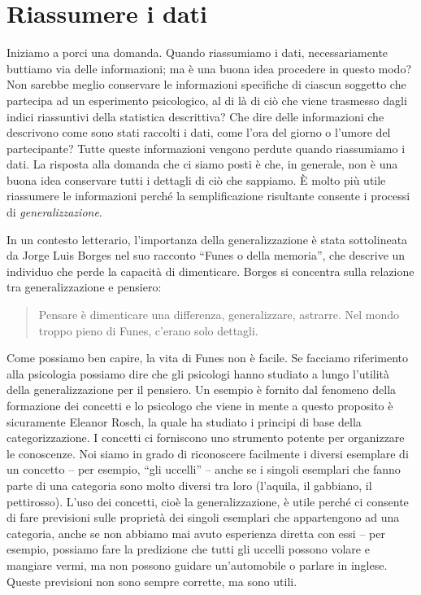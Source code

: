 \documentclass[
  11pt,
  italian,
  a4paper,
  extrafontsizes,onecolumn,openright
  ]{memoir}
\theoremstyle{definition}
\theoremstyle{definition}
\theoremstyle{definition}
\theoremstyle{definition}
\theoremstyle{remark}
\begin{document}
\hypertarget{riassumere-i-dati}{%
\section{Riassumere i dati}\label{riassumere-i-dati}}

Iniziamo a porci una domanda. Quando riassumiamo i dati, necessariamente buttiamo via delle informazioni; ma è una buona idea procedere in questo modo? Non sarebbe meglio conservare le informazioni specifiche di ciascun soggetto che partecipa ad un esperimento psicologico, al di là di ciò che viene trasmesso dagli indici riassuntivi della statistica descrittiva? Che dire delle informazioni che descrivono come sono stati raccolti i dati, come l'ora del giorno o l'umore del partecipante? Tutte queste informazioni vengono perdute quando riassumiamo i dati. La risposta alla domanda che ci siamo posti è che, in generale, non è una buona idea conservare tutti i dettagli di ciò che sappiamo. È molto più utile riassumere le informazioni perché la semplificazione risultante consente i processi di \emph{generalizzazione}.

In un contesto letterario, l'importanza della generalizzazione è stata
sottolineata da Jorge Luis Borges nel suo racconto ``Funes o della
memoria'', che descrive un individuo che perde la capacità di
dimenticare. Borges si concentra sulla relazione tra generalizzazione e
pensiero:

\begin{quote}
Pensare è dimenticare una differenza, generalizzare, astrarre. Nel mondo troppo pieno di Funes, c'erano solo dettagli.
\end{quote}

Come possiamo ben capire, la vita di Funes non è facile. Se facciamo
riferimento alla psicologia possiamo dire che gli psicologi hanno
studiato a lungo l'utilità della generalizzazione per il pensiero. Un
esempio è fornito dal fenomeno della formazione dei concetti e lo
psicologo che viene in mente a questo proposito è sicuramente Eleanor
Rosch, la quale ha studiato i principi di base della categorizzazione. I
concetti ci forniscono uno strumento potente per organizzare le
conoscenze. Noi siamo in grado di riconoscere facilmente i diversi
esemplare di un concetto -- per esempio, ``gli uccelli'' -- anche se i
singoli esemplari che fanno parte di una categoria sono molto diversi
tra loro (l'aquila, il gabbiano, il pettirosso). L'uso dei concetti, cioè
la generalizzazione, è utile perché ci consente di fare previsioni sulle
proprietà dei singoli esemplari che appartengono ad una categoria, anche
se non abbiamo mai avuto esperienza diretta con essi -- per esempio,
possiamo fare la predizione che tutti gli uccelli possono volare e
mangiare vermi, ma non possono guidare un'automobile o parlare in
inglese. Queste previsioni non sono sempre corrette, ma sono utili.
\end{document}
